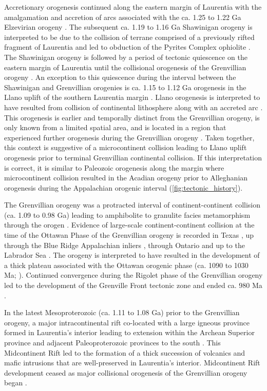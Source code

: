 \documentclass[11pt,letterpaper]{article}
\begin{document}
Accretionary orogenesis continued along the eastern margin of Laurentia with the amalgamation and accretion of arcs associated with the ca. 1.25 to 1.22 Ga Elzevirian orogeny \citep{McLelland2013a}. The subsequent ca. 1.19 to 1.16 Ga Shawinigan orogeny is interpreted to be due to the collision of terrane comprised of a previously rifted fragment of Laurentia and led to obduction of the Pyrites Complex ophiolite \citep{McLelland2010a, Chiarenzelli2011a}. The Shawinigan orogeny is followed by a period of tectonic quiescence on the eastern margin of Laurentia until the collisional orogenesis of the Grenvillian orogeny \citep{McLelland2010a}. An exception to this quiescence during the interval between the Shawinigan and Grenvillian orogenies is ca. 1.15 to 1.12 Ga orogenesis in the Llano uplift of the southern Laurentia margin \citep{Mosher1998a}. Llano orogenesis is interpreted to have resulted from collision of continental lithosphere along with an accreted arc \citep{Mosher1998a}. This orogenesis is earlier and temporally distinct from the Grenvillian orogeny, is only known from a limited spatial area, and is located in a region that experienced further orogenesis during the Grenvillian orogeny \citep{Grimes2004a}. Taken together, this context is suggestive of a microcontinent collision leading to Llano uplift orogenesis prior to terminal Grenvillian continental collision. If this interpretation is correct, it is similar to Paleozoic orogenesis along the margin where microcontinent collision resulted in the Acadian orogeny prior to Alleghanian orogenesis during the Appalachian orogenic interval (\ref{fig:tectonic_history}).

The Grenvillian orogeny was a protracted interval of continent-continent collision (ca. 1.09 to 0.98 Ga) leading to amphibolite to granulite facies metamorphism through the orogen \citep{McLelland2010a}. Evidence of large-scale continent-continent collision at the time of the Ottawan Phase of the Grenvillian orogeny is recorded in Texas \citep{Grimes2004a}, up through the Blue Ridge Appalachian inliers \citep{Johnson2020a}, through Ontario and up to the Labrador Sea \citep{Rivers2008a}. The orogeny is interpreted to have resulted in the development of a thick plateau associated with the Ottawan orogenic phase (ca. 1090 to 1030 Ma; \citealp{Rivers2008a}). Continued convergence during the Rigolet phase of the Grenvillian orogeny led to the development of the Grenville Front tectonic zone and ended ca. 980 Ma \citep{Hynes2010a}.

In the latest Mesoproterozoic (ca. 1.11 to 1.08 Ga) prior to the Grenvillian orogeny, a major intracontinental rift co-located with a large igneous province formed in Laurentia's interior leading to extension within the Archean Superior province and adjacent Paleoproterozoic provinces to the south \citep{Cannon1992b}. This Midcontinent Rift led to the formation of a thick succession of volcanics and mafic intrusions that are well-preserved in Laurentia's interior. Midcontinent Rift development ceased as major collisional orogenesis of the Grenvillian orogeny began \citep{Swanson-Hysell2019a}.
\end{document}
